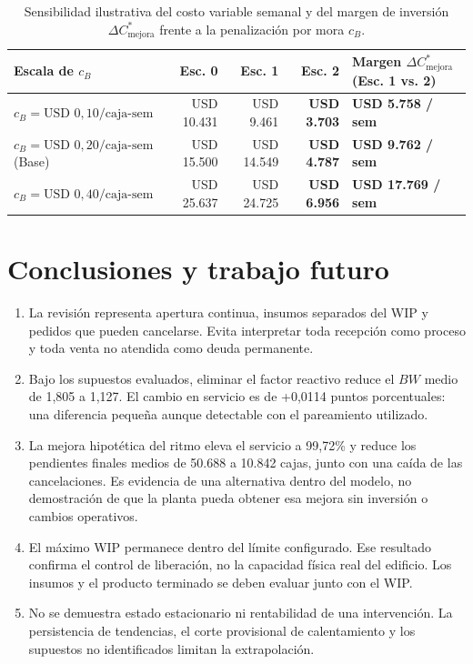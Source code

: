 \documentclass[11pt, a4paper]{article}
\newcommand{\FillIntegral}{99,72}
\newcommand{\BWBase}{1,805}
\newcommand{\BWSinPanico}{1,127}
\newcommand{\BacklogBase}{50.688}
\newcommand{\BacklogIntegral}{10.842}
\newcommand{\DeltaFillSinPanicoBase}{+0,0114}
\begin{document}
\begin{table}[htbp]
\centering\small
\caption{Sensibilidad ilustrativa del costo variable semanal y del margen de inversión $\Delta C_{\text{mejora}}^*$ frente a la penalización por mora $c_B$.}
\label{tab:sensibilidad_costos}
\begin{tabularx}{\textwidth}{lRRRL}
\toprule
Escala de $c_B$ & Esc. 0 & Esc. 1 & Esc. 2 & Margen $\Delta C_{\text{mejora}}^*$ (Esc. 1 vs. 2) \\
\midrule
$c_B = \text{USD } 0{,}10/\text{caja-sem}$ & USD 10.431 & USD 9.461 & \textbf{USD 3.703} & \textbf{USD 5.758 / sem} \\
$c_B = \text{USD } 0{,}20/\text{caja-sem}$ (Base) & USD 15.500 & USD 14.549 & \textbf{USD 4.787} & \textbf{USD 9.762 / sem} \\
$c_B = \text{USD } 0{,}40/\text{caja-sem}$ & USD 25.637 & USD 24.725 & \textbf{USD 6.956} & \textbf{USD 17.769 / sem} \\
\bottomrule
\end{tabularx}
\end{table}

\section{Conclusiones y trabajo futuro}
\begin{enumerate}[leftmargin=0.6cm]
    \item La revisión representa apertura continua, insumos separados del WIP y pedidos que pueden cancelarse. Evita interpretar toda recepción como proceso y toda venta no atendida como deuda permanente.
    \item Bajo los supuestos evaluados, eliminar el factor reactivo reduce el $BW$ medio de \BWBase{} a \BWSinPanico{}. El cambio en servicio es de \DeltaFillSinPanicoBase{} puntos porcentuales: una diferencia pequeña aunque detectable con el pareamiento utilizado.
    \item La mejora hipotética del ritmo eleva el servicio a \FillIntegral\% y reduce los pendientes finales medios de \BacklogBase{} a \BacklogIntegral{} cajas, junto con una caída de las cancelaciones. Es evidencia de una alternativa dentro del modelo, no demostración de que la planta pueda obtener esa mejora sin inversión o cambios operativos.
    \item El máximo WIP permanece dentro del límite configurado. Ese resultado confirma el control de liberación, no la capacidad física real del edificio. Los insumos y el producto terminado se deben evaluar junto con el WIP.
    \item No se demuestra estado estacionario ni rentabilidad de una intervención. La persistencia de tendencias, el corte provisional de calentamiento y los supuestos no identificados limitan la extrapolación.
\end{enumerate}
\end{document}
